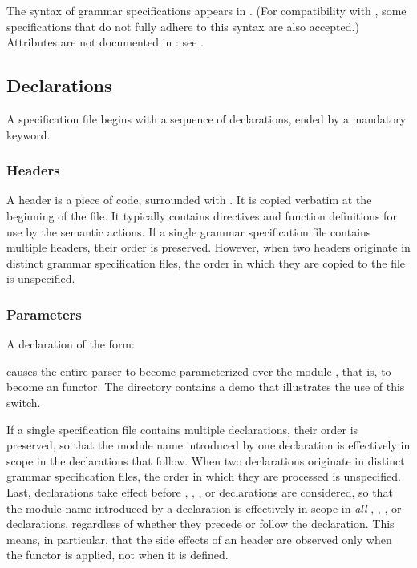 \documentclass[onecolumn,11pt,nocopyrightspace,preprint]{sigplanconf}
\begin{document}
The syntax of grammar specifications appears in . (For
compatibility with \ocamlyacc, some specifications that do not fully adhere to
this syntax are also accepted.) Attributes are not documented in
: see .


\subsection{Declarations}
\label{sec:decls}

A specification file begins with a sequence of declarations, ended by a
mandatory \percentpercent keyword.

\subsubsection{Headers}
\label{sec:decls:headers}

A header is a piece of \ocaml code, surrounded with . It is
copied verbatim at the beginning of the \ml file. It typically contains \ocaml
{} directives and function definitions for use by the semantic
actions. If a single grammar specification file contains multiple headers,
their order is preserved. However, when two headers originate in distinct
grammar specification files, the order in which they are copied to the \ml
file is unspecified.

\subsubsection{Parameters}
\label{sec:parameter}

A declaration of the form:
\begin{quote}
\dparameter \ocamlparam
\end{quote}
causes the entire parser to become parameterized over the \ocaml module
, that is, to become an \ocaml functor. The directory
 contains a demo that illustrates the use of this switch.

If a single specification file
contains multiple \dparameter declarations, their order is preserved, so that
the module name  introduced by one declaration is effectively in scope
in the declarations that follow. When two \dparameter declarations originate
in distinct grammar specification files, the order in which they are processed
is unspecified. Last, \dparameter declarations take effect before \dheader{$\ldots$},
\dtoken, \dtype, or \dstart declarations are considered, so that the module name
 introduced by a \dparameter declaration is effectively in scope in
\emph{all} \dheader{$\ldots$}, \dtoken, \dtype, or \dstart declarations,
regardless of whether they precede or follow the \dparameter declaration.
This means, in particular, that the side effects of an \ocaml header are
observed only when the functor is applied, not when it is defined.
\end{document}
